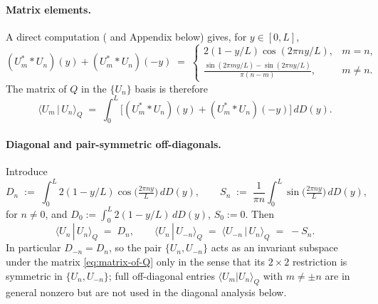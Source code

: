 \documentclass[11pt,a4paper]{article}
\theoremstyle{remark}
\theoremstyle{plain}
\begin{document}
\paragraph{Matrix elements.}  A direct computation
(\cite[Equation~7]{ConnesvS2025} and Appendix below) gives, for $y\in[0,L]$,
\begin{equation}
\label{eq:matrix-elements-Q}
  (U_m^* * U_n)(y) + (U_m^* * U_n)(-y)
  \;=\;
  \begin{cases}
    2(1-y/L)\cos(2\pi n y/L), & m=n,\\[2pt]
    \displaystyle\frac{\sin(2\pi m y/L) - \sin(2\pi n y/L)}{\pi(n-m)}, & m\neq n.
  \end{cases}
\end{equation}
The matrix of $Q$ in the $\{U_n\}$ basis is therefore
\begin{equation}
\label{eq:matrix-of-Q}
  \langle U_m \,|\, U_n\rangle_Q
  \;=\;
  \int_0^L
  \bigl[(U_m^* * U_n)(y) + (U_m^* * U_n)(-y)\bigr]\,dD(y).
\end{equation}

\paragraph{Diagonal and pair-symmetric off-diagonals.}  Introduce
\begin{equation}
\label{eq:Dn-Sn}
  D_n \;:=\; \int_0^L 2(1 - y/L)\cos\!\Big(\tfrac{2\pi n y}{L}\Big)\,dD(y),
  \qquad
  S_n \;:=\; \frac{1}{\pi n}\int_0^L \sin\!\Big(\tfrac{2\pi n y}{L}\Big)\,dD(y),
\end{equation}
for $n\neq 0$, and $D_0:=\int_0^L 2(1-y/L)\,dD(y)$, $S_0:=0$.  Then
\begin{equation}
\label{eq:U-diag-and-pair}
  \langle U_n\,|\,U_n\rangle_Q \;=\; D_n,
  \qquad
  \langle U_n\,|\,U_{-n}\rangle_Q
  \;=\; \langle U_{-n}\,|\,U_n\rangle_Q
  \;=\; -S_n.
\end{equation}
In particular $D_{-n}=D_n$, so the pair $\{U_n,U_{-n}\}$ acts as an
invariant subspace under the matrix \eqref{eq:matrix-of-Q} only in the
sense that its $2\times 2$ restriction is symmetric in
$\{U_n,U_{-n}\}$; full off-diagonal entries
$\langle U_m|U_n\rangle_Q$ with $m\neq\pm n$ are in general
nonzero but are not used in the diagonal analysis below.
\end{document}
